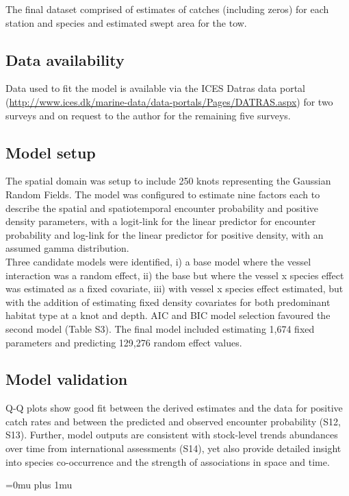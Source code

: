 \documentclass[fleqn,10pt]{wlscirep}
\begin{document}
\begin{linenumbers}
The final dataset comprised of estimates of catches (including zeros) for each
station and species and estimated swept area for the tow.\\

\subsection*{Data availability\\}

Data used to fit the model is available via the ICES Datras data portal
(\url{http://www.ices.dk/marine-data/data-portals/Pages/DATRAS.aspx}) for two
surveys and on request to the author for the remaining five surveys.\\

\subsection*{Model setup\\}

The spatial domain was setup to include 250 knots representing the Gaussian
Random Fields. The model was configured to estimate nine factors each to describe
the spatial and spatiotemporal encounter probability and positive density
parameters, with a logit-link for the linear predictor for encounter
probability and log-link for the linear predictor for positive density, with an
assumed gamma distribution.\\

Three candidate models were identified, i) a base model where the vessel
interaction was a random effect, ii) the base but where the vessel x species
effect was estimated as a fixed covariate, iii) with vessel x species effect
estimated, but with the addition of estimating fixed density covariates for
both predominant habitat type at a knot and depth. AIC and BIC model selection
favoured the second model (Table S3). The final model included estimating 1,674
fixed parameters and predicting 129,276 random effect values.\\

\subsection*{Model validation\\}

Q-Q plots show good fit between the derived estimates and the data for positive
catch rates and between the predicted and observed encounter probability (S12,
S13).  Further, model outputs are consistent with stock-level trends abundances
over time from international assessments (S14), yet also provide detailed
insight into species co-occurrence and the strength of associations in space
and time. \\

\end{linenumbers}
\newpage
\Urlmuskip=0mu plus 1mu\relax
%

\end{document}
